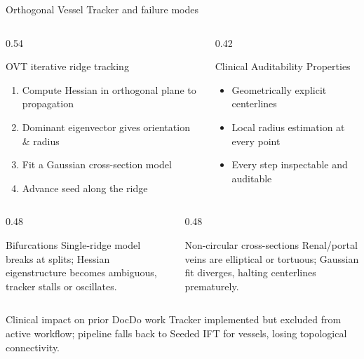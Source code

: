 \documentclass[aspectratio=169,11pt,xcolor=table]{beamer}
\begin{document}
\begin{frame}{Orthogonal Vessel Tracker and failure modes}
\footnotesize
\begin{columns}[T]
\begin{column}{0.54\linewidth}
  \begin{block}{OVT iterative ridge tracking}
    \scriptsize
    \begin{enumerate}
    \setlength\itemsep{1pt}
    \item Compute Hessian in orthogonal plane to propagation
    \item Dominant eigenvector gives orientation \& radius
    \item Fit a Gaussian cross-section model
    \item Advance seed along the ridge
    \end{enumerate}
  \end{block}
\end{column}
\begin{column}{0.42\linewidth}
  \begin{block}{Clinical Auditability Properties}
    \scriptsize
    \begin{itemize}
    \setlength\itemsep{1pt}
    \item Geometrically explicit centerlines
    \item Local radius estimation at every point
    \item Every step inspectable and auditable
    \end{itemize}
  \end{block}
\end{column}
\end{columns}
\vspace{0.1cm}
\begin{columns}[T]
\begin{column}{0.48\linewidth}
  \begin{block}{Bifurcations}
    \scriptsize
    Single-ridge model breaks at splits; Hessian eigenstructure becomes ambiguous, tracker stalls or oscillates.
  \end{block}
\end{column}
\begin{column}{0.48\linewidth}
  \begin{block}{Non-circular cross-sections}
    \scriptsize
    Renal/portal veins are elliptical or tortuous; Gaussian fit diverges, halting centerlines prematurely.
  \end{block}
\end{column}
\end{columns}
\vspace{0.05cm}
\begin{alertblock}{Clinical impact on prior DocDo work}
\scriptsize Tracker implemented but excluded from active workflow; pipeline falls back to Seeded IFT for vessels, losing topological connectivity.
\end{alertblock}
\end{frame}
\end{document}
